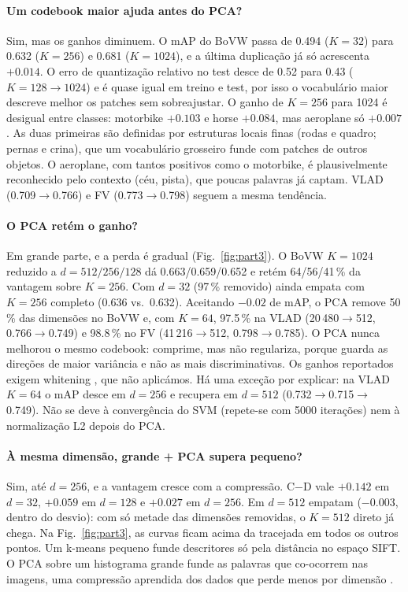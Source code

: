 \paragraph{Um codebook maior ajuda antes do PCA?}
Sim, mas os ganhos diminuem. O mAP do BoVW passa de 0.494 ($K=32$) para 0.632
($K=256$) e 0.681 ($K=1024$), e a última duplicação já só acrescenta $+0.014$.
O erro de quantização relativo no test desce de 0.52 para 0.43 ($K=128\to1024$) e é
quase igual em treino e test, por isso o vocabulário maior descreve melhor os
patches sem sobreajustar. O ganho de $K=256$ para 1024 é desigual entre
classes: motorbike $+0.103$ e horse $+0.084$, mas aeroplane só $+0.007$. As
duas primeiras são definidas por estruturas locais finas (rodas e quadro;
pernas e crina), que um vocabulário grosseiro funde com patches de outros
objetos. O aeroplane, com tantos positivos como o motorbike, é plausivelmente
reconhecido pelo contexto (céu, pista), que poucas palavras já captam. VLAD
(0.709$\to$0.766) e FV (0.773$\to$0.798) seguem a mesma tendência.

\paragraph{O PCA retém o ganho?}
Em grande parte, e a perda é gradual (Fig.~\ref{fig:part3}). O BoVW $K=1024$
reduzido a $d=512/256/128$ dá 0.663/0.659/0.652 e retém 64/56/41\,\% da
vantagem sobre $K=256$. Com $d=32$ (97\,\% removido) ainda empata com
$K=256$ completo (0.636 vs.\ 0.632). Aceitando $-0.02$ de mAP, o PCA remove
50\,\% das dimensões no BoVW e, com $K=64$, 97.5\,\% na VLAD
(20\,480$\to$512, 0.766$\to$0.749) e 98.8\,\% no FV (41\,216$\to$512,
0.798$\to$0.785). O PCA nunca melhorou o mesmo codebook: comprime, mas não
regulariza, porque guarda as direções de maior
variância e não as mais discriminativas. Os ganhos reportados exigem whitening
\cite{jegou2012negative}, que não aplicámos. Há uma exceção por explicar: na
VLAD $K=64$ o mAP desce em $d=256$ e recupera em $d=512$
(0.732$\to$0.715$\to$0.749). Não se deve à convergência do SVM (repete-se com
5000 iterações) nem à normalização L2 depois do PCA.

\paragraph{À mesma dimensão, grande + PCA supera pequeno?}
Sim, até $d=256$, e a vantagem cresce com a compressão. C$-$D vale
$+0.142$ em $d=32$, $+0.059$ em $d=128$ e $+0.027$ em $d=256$. Em $d=512$
empatam ($-0.003$, dentro do desvio): com só metade das dimensões removidas,
o $K=512$ direto já chega. Na Fig.~\ref{fig:part3}, as curvas ficam acima da
tracejada em todos os outros pontos. Um k-means pequeno funde descritores só pela distância no espaço
SIFT. O PCA sobre um histograma grande funde as palavras que co-ocorrem nas
imagens, uma compressão aprendida dos dados que perde menos por dimensão
\cite{jegou2012aggregating}.

